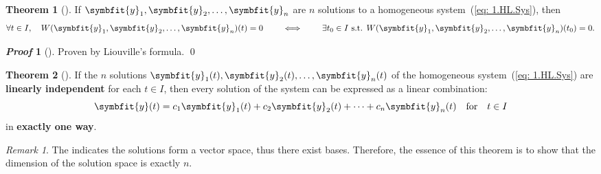 \documentclass[10pt,UTF8]{article}
\renewcommand{\vec}[1]{%
  \ifnum0\ifcat#1a1\else0\fi>0
  \symbfit{#1}  %
  \else
  \symbf{#1}  %
  \fi
}
\newenvironment{theoremBox}
{ \bigskip
  \begin{tcolorbox}[colback=yellow!5!white,colframe=yellow!75!black,parbox=false,before
  upper=\par,before lower=\par]}
  {
\end{tcolorbox}}
\theoremstyle{definition}
\newtheorem{definition inner}{Definition}[section]
\theoremstyle{definition}
\newtheorem{theorem inner}{Theorem}[section]
\newenvironment{theorem}[1][]
{
  \begin{theoremBox}
  \begin{theorem inner}[#1]\hfill\par}
    {
    \end{theorem inner}
\end{theoremBox}}
\theoremstyle{definition}
\newtheorem*{proof inner}{\textit{Proof}}
\renewenvironment{proof}[1][]
{
\begin{proof inner}[#1]\hfill\par}
  {\qed\vphantom{.}
\end{proof inner}}
\theoremstyle{plain}
\newtheorem{tip inner}{Tip}[section]
\theoremstyle{remark}
\newtheorem*{remark}{\textit{Remark}}
\begin{document}
\begin{theorem}
  {}\label{thm: nonzero Wronskian}
  If \(\vec{y}_1, \vec{y}_2, \ldots, \vec{y}_n\) are
  \(n\) solutions to
  a homogeneous system~(\ref{eq: 1.HL.Sys}),
  then
  \begin{equation*}
    \forall t\in I, \quad
    W(\vec{y}_1, \vec{y}_2, \ldots, \vec{y}_n)(t) = 0
    \qquad\iff\qquad
    \exists t_0 \in I \text{ s.t. }
    W(\vec{y}_1, \vec{y}_2, \ldots, \vec{y}_n)(t_0) = 0.
  \end{equation*}
\end{theorem}
\begin{proof}
  Proven by Liouville's formula.
\end{proof}

\begin{theorem}
  If the \(n\) solutions \(\vec{y}_1(t), \vec{y}_2(t),
  \ldots, \vec{y}_n(t)\)
  of the homogeneous system~(\ref{eq: 1.HL.Sys})
  are \textbf{linearly independent} for each \(t\in I\),
  then every solution of the system can be expressed as a linear combination:
  \begin{equation*}
    \vec{y}(t) = c_1 \vec{y}_1(t) + c_2 \vec{y}_2(t) + \cdots
    + c_n \vec{y}_n(t)
    \qfor t\in I
  \end{equation*}
  in \textbf{exactly one way}.
\end{theorem}
\begin{remark}
  The  indicates
  the solutions form a vector space, thus there exist bases.
  Therefore, the essence of this theorem is to show that the dimension
  of the solution space is exactly \(n\).
\end{remark}
\end{document}
